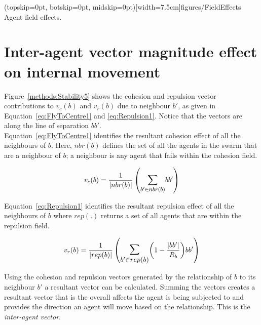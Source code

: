 \documentclass{ieeeaccess}
\begin{document}
\Figure[t!](topskip=0pt, botskip=0pt, midskip=0pt)[width=7.5cm]{figures/FieldEffects}
{Agent field effects.\label{methods:FieldEffects}}


\section{Inter-agent vector magnitude effect on internal movement}\label{Section:StabilityMagnitude}
Figure~\ref{methods:Stability5} shows the cohesion and repulsion vector contributions to $v_c(b)$ and $v_r(b)$ due to neighbour $b'$, as given in Equation~\ref{eq:FlyToCentre1} and \ref{eq:Repulsion1}. Notice that the vectors are along the line of separation $bb'$. \\


Equation~\ref{eq:FlyToCentre1} identifies the resultant cohesion effect of all the neighbours of $b$. Here, $nbr(b)$ defines the set of all the agents in the swarm that are a neighbour of $b$; a neighbour is any agent that fails within the cohesion field.

\begin{equation}\label{eq:FlyToCentre1}
v_{c}(b) = \frac{1}{|nbr(b)|}\left({\mathlarger{\sum_{b' \in nbr(b)}}{bb'}}\right)
\end{equation}

Equation~\ref{eq:Repulsion1} identifies the resultant repulsion effect of all the neighbours of $b$ where $rep(.)$ returns a set of all agents that are within the repulsion field.

\begin{equation}
\label{eq:Repulsion1}
v_{r}(b) = 
\frac{1}{|rep(b)|}
\left(
\mathlarger{\mathlarger{\sum_{b' \in rep(b)}}}
{\left( 1-\frac{|bb'|}{R_b} \right)}
{bb'}
\right)
\end{equation}

Using the cohesion and repulsion vectors generated by the relationship of $b$ to its neighbour $b'$ a resultant vector can be calculated. Summing the vectors creates a resultant vector that is the overall affects the agent is being subjected to and provides the direction an agent will move based on the relationship. This is the \textit{inter-agent vector}.
\end{document}
